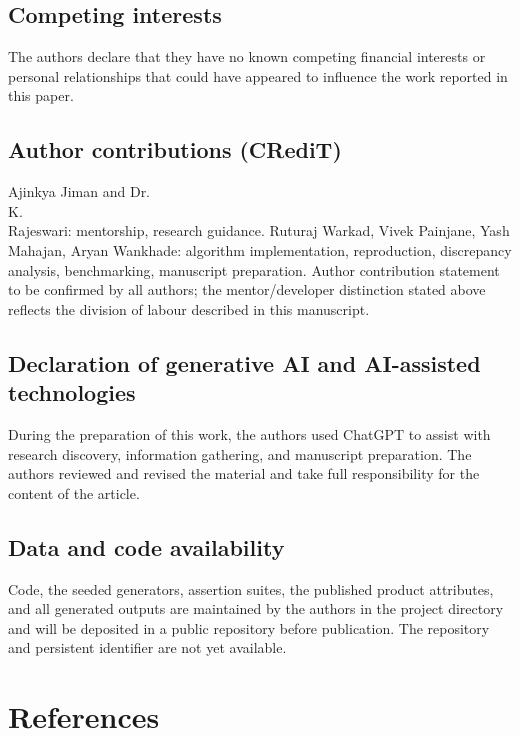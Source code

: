 \documentclass[12pt,twocolumn,a4paper]{elsarticle}
\begin{document}
\subsection{Competing interests}
The authors declare that they have no known competing financial interests or personal relationships that could have appeared to influence the work reported in this paper.

\subsection{Author contributions (CRediT)}
Ajinkya Jiman and Dr.\\ K.\\ Rajeswari: mentorship, research guidance. Ruturaj Warkad, Vivek Painjane, Yash Mahajan, Aryan Wankhade: algorithm implementation, reproduction, discrepancy analysis, benchmarking, manuscript preparation. Author contribution statement to be confirmed by all authors; the mentor/developer distinction stated above reflects the division of labour described in this manuscript.

\subsection{Declaration of generative AI and AI-assisted technologies}
During the preparation of this work, the authors used ChatGPT to assist with research discovery, information gathering, and manuscript preparation. The authors reviewed and revised the material and take full responsibility for the content of the article.

\subsection{Data and code availability}
Code, the seeded generators, assertion suites, the published product attributes, and all generated outputs are maintained by the authors in the project directory and will be deposited in a public repository before publication. The repository and persistent identifier are not yet available.

\section*{References}



\end{document}
